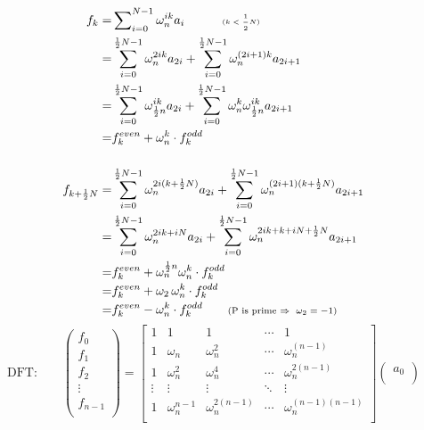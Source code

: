 \documentclass[a4paper]{article}
\begin{document}
\begin{body}
\begin{equation}[Cooley-Turkey]
\begin{aligned}
			f_{k}=&\sum\nolimits_{i=0}^{N-1}\omega_{n}^{ik}a_{i}\qquad\quad\text{\tiny $(k<\frac{1}{2}N)$}\\
			=&\sum\limits_{i=0}^{\frac{1}{2}N-1}\omega_{n}^{2ik}a_{2i}+\sum\limits_{i=0}^{\frac{1}{2}N-1}\omega_{n}^{(2i+1)k}a_{2i+1}\\
			=&\sum\limits_{i=0}^{\frac{1}{2}N-1}\omega_{\frac{1}{2}n}^{ik}a_{2i}+\sum\limits_{i=0}^{\frac{1}{2}N-1}\omega_{n}^{k}\omega_{\frac{1}{2}n}^{ik}a_{2i+1}\\
			=&f^{even}_{k}+\omega_{n}^{k}\cdot f^{odd}_{k}\\
			\\
			f_{k+\frac{1}{2}N}		=&\sum\limits_{i=0}^{\frac{1}{2}N-1}\omega_{n}^{2i(k+\frac{1}{2}N)}a_{2i}+\sum\limits_{i=0}^{\frac{1}{2}N-1}\omega_{n}^{(2i+1)(k+\frac{1}{2}N)}a_{2i+1}\\
			=&\sum\limits_{i=0}^{\frac{1}{2}N-1}\omega_{n}^{2ik+iN}a_{2i}+\sum\limits_{i=0}^{\frac{1}{2}N-1}\omega_{n}^{2ik+k+iN+\frac{1}{2}N}a_{2i+1}\\
			=&f^{even}_{k}+\omega_{n}^{\frac{1}{2}{n}}\omega_{n}^{k}\cdot f^{odd}_{k}\\
			=&f^{even}_{k}+\omega_{2}\,\omega_{n}^{k}\cdot f^{odd}_{k}\\
			=&f^{even}_{k}-\omega_{n}^{k}\cdot f^{odd}_{k}\qquad\text{\scriptsize (P is prime $\Rightarrow\ \omega_{2}=-1$)}
			\end{aligned}
		\end{equation}
		\begin{equation}[DFT]
			\text{DFT:}\qquad
			\begin{pmatrix}
			f_{0}\\
			f_{1}\\
			f_{2}\\
			\vdots\\
			f_{n-1}\\
			\end{pmatrix}
			=
			\begin{bmatrix}
			1&1&1&\cdots&1\\
			1&\omega_{n}&\omega_{n}^{2}&\cdots&\omega_{n}^{(n-1)}\\
			1&\omega_{n}^{2}&\omega_{n}^{4}&\cdots&\omega_{n}^{2(n-1)}\\
			\vdots&\vdots&\vdots&\ddots&\vdots\\
			1&\omega_{n}^{n-1}&\omega_{n}^{2(n-1)}&\cdots&\omega_{n}^{(n-1)(n-1)}\\
			\end{bmatrix}
			\begin{pmatrix}
			a_{0}\\

\end{pmatrix}
\end{equation}
\end{body}
\end{document}
